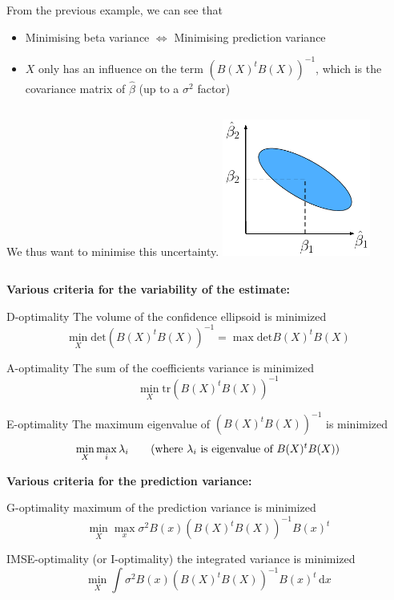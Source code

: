 \documentclass{beamer}
\newcommand\dx{\, \mathrm{d}}
\begin{document}
\begin{frame}{}
From the previous example, we can see that 
\begin{itemize}
	\item Minimising beta variance $\Leftrightarrow$ Minimising prediction variance
	\item $X$ only has an influence on the term $(B(X)^t B(X))^{-1}$, which is the covariance matrix of $\hat{\beta}$ (up to a $\sigma^2$ factor)
\end{itemize}
\vspace{5mm}
\begin{columns}[c]
\column{3cm}
We thus want to minimise this uncertainty.
\column{5cm}
\includegraphics[height=4.5cm]{figures/latexdraw/optimalDoEreg}
\end{columns}
\end{frame}

\begin{frame}{}
\textbf{Various criteria for the variability of the estimate:}
\begin{block}{D-optimality}
	The volume of the confidence ellipsoid is minimized
	$$ \min_X \mathrm{det} (B(X)^t B(X))^{-1} = \max \mathrm{det} B(X)^t B(X)$$
\end{block}
\begin{block}{A-optimality}
	The sum of the coefficients variance is minimized
	$$ \min_X \mathrm{tr} (B(X)^t B(X))^{-1} $$
\end{block}
\begin{block}{E-optimality}
	The maximum eigenvalue of $(B(X)^t B(X))^{-1}$ is minimized
	$$ \min_X \max_i \lambda_i \text{\qquad (where $\lambda_i$ is eigenvalue of $B(X)^t B(X))$}$$
\end{block}
\end{frame}

\begin{frame}{}
\textbf{Various criteria for the prediction variance:}
\begin{block}{G-optimality}
	maximum of the prediction variance is minimized
	$$ \min_X \max_x \sigma^2 B(x) (B(X)^t B(X))^{-1} B(x)^t$$
\end{block}
\begin{block}{IMSE-optimality (or I-optimality)}
	the integrated variance is minimized
	$$ \min_X \int \sigma^2 B(x) (B(X)^t B(X))^{-1} B(x)^t \dx x$$
\end{block}
\end{frame}
\end{document}
